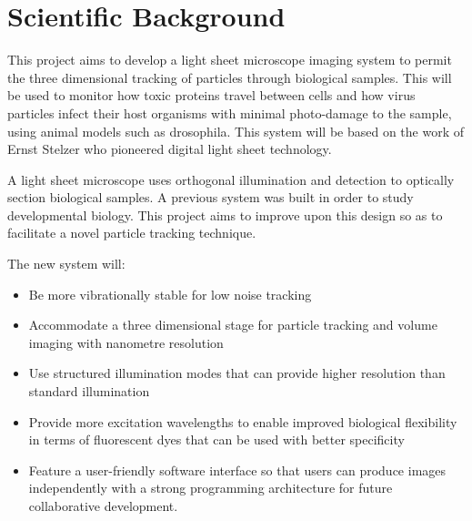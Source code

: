 
\section{Scientific Background}
This project aims to develop a light sheet microscope imaging system to permit the three dimensional tracking of particles through biological samples.
This will be used to monitor how toxic proteins travel between cells and how virus particles infect their host organisms with minimal %
photo-damage to the sample, using animal models such as drosophila.
This system will be based on the work of Ernst Stelzer who pioneered digital light sheet technology\cite{Huisken2004}.

A light sheet microscope uses orthogonal illumination and detection to optically section biological samples.
A previous system was built in order to study developmental biology.
This project aims to improve upon this design so as to facilitate a novel particle tracking technique.

The new system will:
\begin{itemize}
	\item Be more vibrationally stable for low noise tracking
	\item Accommodate a three dimensional stage for particle tracking and volume imaging with nanometre resolution
	\item Use structured illumination modes that can provide higher resolution than standard illumination
	\item Provide more excitation wavelengths to enable improved biological flexibility in terms of fluorescent dyes that can be used with better specificity
	\item Feature a user-friendly software interface so that users can produce images independently with a strong programming architecture for future collaborative development.
\end{itemize}

